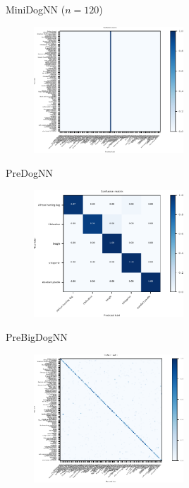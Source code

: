   \begin{frame}{MiniDogNN ($n = 120$)}
    \begin{figure}
      \centering
      \includegraphics[width=0.5\textwidth]{logos/MiniDogNN/confusion_matrix_mini120.pdf}
      \label{fig:cm_mini120}
    \end{figure}
  \end{frame}

  \begin{frame}{PreDogNN}
    \begin{figure}
      \centering
      \includegraphics[width=0.5\textwidth]{logos/PreDogNN/confusion_matrix_PreDogNN.pdf}
      \label{fig:cm_pre}
    \end{figure}
  \end{frame}

  \begin{frame}{PreBigDogNN}
    \begin{figure}
      \centering
      \includegraphics[width=0.5\textwidth]{logos/PreBigDogNN/confusion_matrix_bigpretrained.pdf}
      \label{fig:cm_prebig}
    \end{figure}
  \end{frame}

